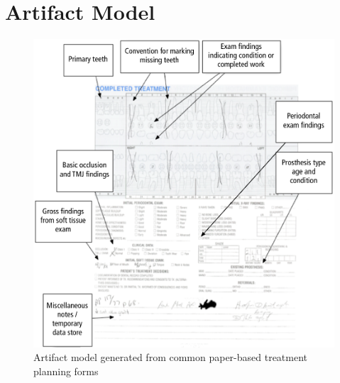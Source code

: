 \documentclass[11pt]{article}
\begin{document}
\section{Artifact Model}
\begin{figure}[h!b]
\begin{center}
\includegraphics[width=\textwidth]{artifactmodel.png}
\end{center}
\caption{Artifact model generated from common paper-based treatment planning forms}
\end{figure}
\end{document}
